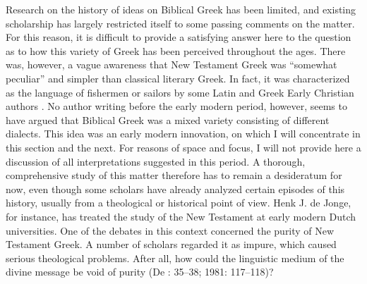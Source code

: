 \documentclass[output=paper]{langsci/langscibook}
\begin{document}
Research on the history of ideas on Biblical Greek has been limited, and existing scholarship has largely restricted itself to some passing comments on the matter. For this reason, it is difficult to provide a satisfying answer here to the question as to how this variety of Greek has been perceived throughout the ages. There was, however, a vague awareness that New Testament Greek was “somewhat peculiar” and simpler than classical literary Greek. In fact, it was characterized as the language of fishermen or sailors by some Latin and Greek Early Christian authors \citep[647]{Janse2007}. No author writing before the early modern period, however, seems to have argued that Biblical Greek was a mixed variety consisting of different dialects. This idea was an early modern innovation, on which I will concentrate in this section and the next. For reasons of space and focus, I will not provide here a discussion of all interpretations suggested in this period. A thorough, comprehensive study of this matter therefore has to remain a desideratum for now, even though some scholars have already analyzed certain episodes of this history, usually from a theological or historical point of view. Henk J. de Jonge, for instance, has treated the study of the New Testament at early modern Dutch universities. One of the debates in this context concerned the purity of New Testament Greek. A number of scholars regarded it as impure, which caused serious theological problems. After all, how could the linguistic medium of the divine message be void of purity (De \citealt{Jonge1980}: 35–38; 1981: 117–118)?
\end{document}

